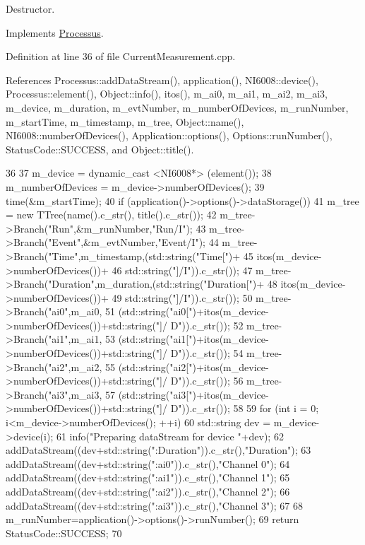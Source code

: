 Destructor. 

Implements \hyperlink{classProcessus_aee88ad7b77ae7319cf8b128e9dd2ea11}{Processus}.

Definition at line 36 of file CurrentMeasurement.cpp.

References Processus::addDataStream(), application(), NI6008::device(), Processus::element(), Object::info(), itos(), m\_\-ai0, m\_\-ai1, m\_\-ai2, m\_\-ai3, m\_\-device, m\_\-duration, m\_\-evtNumber, m\_\-numberOfDevices, m\_\-runNumber, m\_\-startTime, m\_\-timestamp, m\_\-tree, Object::name(), NI6008::numberOfDevices(), Application::options(), Options::runNumber(), StatusCode::SUCCESS, and Object::title().


\begin{DoxyCode}
36                                             {
37   m_device = dynamic_cast <NI6008*> (element());
38   m_numberOfDevices = m_device->numberOfDevices();
39   time(&m_startTime); 
40   if (application()->options()->dataStorage()){
41     m_tree = new TTree(name().c_str(), title().c_str());
42     m_tree->Branch("Run",&m_runNumber,"Run/I");
43     m_tree->Branch("Event",&m_evtNumber,"Event/I");
44     m_tree->Branch("Time",m_timestamp,(std::string("Time[")+
45                        itos(m_device->numberOfDevices())+
46                        std::string("]/I")).c_str());
47     m_tree->Branch("Duration",m_duration,(std::string("Duration[")+
48                        itos(m_device->numberOfDevices())+
49                        std::string("]/I")).c_str());
50     m_tree->Branch("ai0",m_ai0,
51            (std::string("ai0[")+itos(m_device->numberOfDevices())+std::string("]/
      D")).c_str());
52     m_tree->Branch("ai1",m_ai1,
53            (std::string("ai1[")+itos(m_device->numberOfDevices())+std::string("]/
      D")).c_str());
54     m_tree->Branch("ai2",m_ai2,
55            (std::string("ai2[")+itos(m_device->numberOfDevices())+std::string("]/
      D")).c_str());
56     m_tree->Branch("ai3",m_ai3,
57            (std::string("ai3[")+itos(m_device->numberOfDevices())+std::string("]/
      D")).c_str());
58   }
59   for (int i = 0; i<m_device->numberOfDevices(); ++i){
60     std::string dev = m_device->device(i);
61     info("Preparing dataStream for device "+dev);
62     addDataStream((dev+std::string(":Duration")).c_str(),"Duration");
63     addDataStream((dev+std::string(":ai0")).c_str(),"Channel 0");
64     addDataStream((dev+std::string(":ai1")).c_str(),"Channel 1");
65     addDataStream((dev+std::string(":ai2")).c_str(),"Channel 2");
66     addDataStream((dev+std::string(":ai3")).c_str(),"Channel 3");
67   }
68   m_runNumber=application()->options()->runNumber();
69   return StatusCode::SUCCESS;
70 }
\end{DoxyCode}
